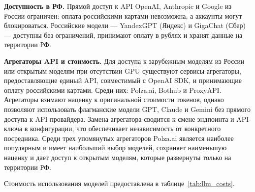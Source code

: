 

\textbf{Доступность в РФ.} Прямой доступ к API OpenAI, Anthropic и Google из России ограничен: оплата российскими картами невозможна, а аккаунты могут блокироваться. Российские модели --- YandexGPT (Яндекс) и GigaChat (Сбер) --- доступны без ограничений, принимают оплату в рублях и хранят данные на территории РФ.

\textbf{Агрегаторы API и стоимость.} Для доступа к зарубежным моделям из России или открытым моделям при отсутствии GPU существуют сервисы-агрегаторы, предоставляющие единый API, совместимый с OpenAI SDK, и принимающие оплату российскими картами. Среди них: Polza.ai, Bothub и ProxyAPI. Агрегаторы взимают наценку к оригинальной стоимости токенов, однако позволяют использовать флагманские модели GPT, Claude и Gemini без прямого доступа к API провайдера. Замена агрегатора сводится к смене эндпоинта и API-ключа в конфигурации, что обеспечивает независимость от конкретного посредника. Среди трех упомянутых агрегаторов Polza.ai является наиболее популярным и имеет наибольший выбор моделей, сохраняет наименьшую наценку и дает доступ к открытым моделям, которые развернуты только на территории РФ.

Стоимость использования моделей предоставлена в таблице~\ref{tab:llm_costs}.

